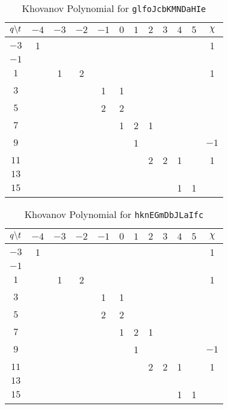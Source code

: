     \begin{table}
        \centering
        \begin{tabular}{| c | c | c | c | c | c | c | c | c | c | c | c |}
            \hline
            $q\symbol{92}t$&$-4$&$-3$&$-2$&$-1$&$0$&$1$&$2$&$3$&$4$&$5$&$\chi$\\
            \hline
            $-3$&1&&&&&&&&&&1\\
            \hline
            $-1$&&&&&&&&&&&\\
            \hline
            $1$&&1&2&&&&&&&&1\\
            \hline
            $3$&&&&1&1&&&&&&\\
            \hline
            $5$&&&&2&2&&&&&&\\
            \hline
            $7$&&&&&1&2&1&&&&\\
            \hline
            $9$&&&&&&1&&&&&$-1$\\
            \hline
            $11$&&&&&&&2&2&1&&1\\
            \hline
            $13$&&&&&&&&&&&\\
            \hline
            $15$&&&&&&&&&1&1&\\
            \hline
        \end{tabular}
        \caption{Khovanov Polynomial for \texttt{glfoJcbKMNDaHIe}}
    \end{table}
    \begin{table}
        \centering
        \begin{tabular}{| c | c | c | c | c | c | c | c | c | c | c | c |}
            \hline
            $q\symbol{92}t$&$-4$&$-3$&$-2$&$-1$&$0$&$1$&$2$&$3$&$4$&$5$&$\chi$\\
            \hline
            $-3$&1&&&&&&&&&&1\\
            \hline
            $-1$&&&&&&&&&&&\\
            \hline
            $1$&&1&2&&&&&&&&1\\
            \hline
            $3$&&&&1&1&&&&&&\\
            \hline
            $5$&&&&2&2&&&&&&\\
            \hline
            $7$&&&&&1&2&1&&&&\\
            \hline
            $9$&&&&&&1&&&&&$-1$\\
            \hline
            $11$&&&&&&&2&2&1&&1\\
            \hline
            $13$&&&&&&&&&&&\\
            \hline
            $15$&&&&&&&&&1&1&\\
            \hline
        \end{tabular}
        \caption{Khovanov Polynomial for \texttt{hknEGmDbJLaIfc}}
    \end{table}
